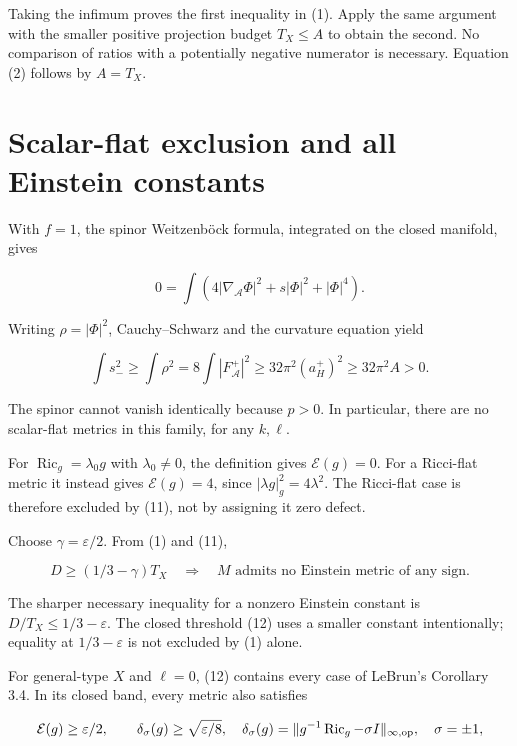 \documentclass[
  11pt,
]{article}
\begin{document}
Taking the infimum proves the first inequality in (1). Apply the same
argument with the smaller positive projection budget \(T_X\le A\) to
obtain the second. No comparison of ratios with a potentially negative
numerator is necessary. Equation (2) follows by \(A=T_X\).

\hypertarget{scalar-flat-exclusion-and-all-einstein-constants}{%
\section{Scalar-flat exclusion and all Einstein
constants}\label{scalar-flat-exclusion-and-all-einstein-constants}}

With \(f=1\), the spinor Weitzenböck formula, integrated on the closed
manifold, gives

\[
0=\int(4|\nabla_{\mathcal A}\Phi|^2+s|\Phi|^2+|\Phi|^4).
\]

Writing \(\rho=|\Phi|^2\), Cauchy--Schwarz and the curvature equation
yield

\[
\int s_-^2\ge\int\rho^2
=8\int|F_{\mathcal A}^+|^2
\ge32\pi^2(a_H^+)^2\ge32\pi^2A>0.                     \tag{11}
\]

The spinor cannot vanish identically because \(p>0\). In particular,
there are no scalar-flat metrics in this family, for any \(k,\ell\).

For \(\operatorname{Ric}_g=\lambda_0g\) with \(\lambda_0\ne0\), the
definition gives \(\mathcal E(g)=0\). For a Ricci-flat metric it instead
gives \(\mathcal E(g)=4\), since \(|\lambda g|_g^2=4\lambda^2\). The
Ricci-flat case is therefore excluded by (11), not by assigning it zero
defect.

Choose \(\gamma=\varepsilon/2\). From (1) and (11),

\[
\boxed{D\ge(1/3-\gamma)T_X
\quad\Longrightarrow\quad
M\text{ admits no Einstein metric of any sign}.}        \tag{12}
\]

The sharper necessary inequality for a nonzero Einstein constant is
\(D/T_X\le1/3-\varepsilon\). The closed threshold (12) uses a smaller
constant intentionally; equality at \(1/3-\varepsilon\) is not excluded
by (1) alone.

For general-type \(X\) and \(\ell=0\), (12) contains every case of
LeBrun's Corollary 3.4. In its closed band, every metric also satisfies

\[
\mathcal E(g)\ge\varepsilon/2,\qquad
\delta_\sigma(g)\ge\sqrt{\varepsilon/8},\quad
\delta_\sigma(g)=\|g^{-1}\operatorname{Ric}_g-\sigma I\|_{\infty,\rm op},
\quad \sigma=\pm1,
\]
\end{document}
